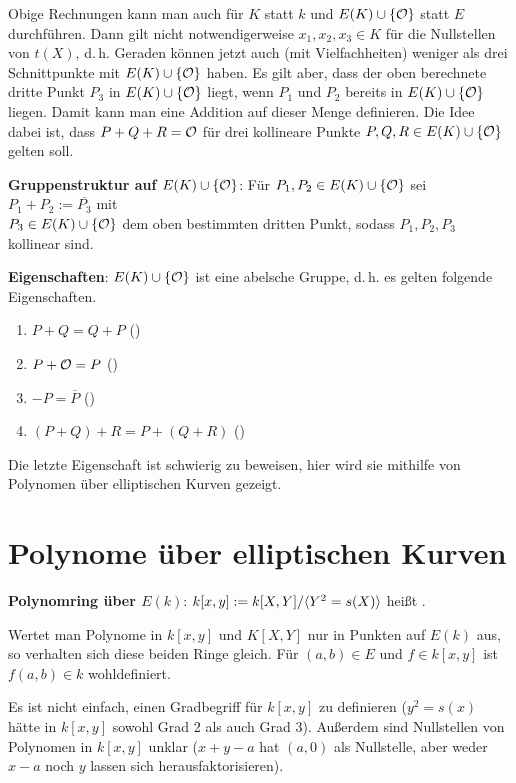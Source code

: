 Obige Rechnungen kann man auch für $K$ statt $k$ und $E(K) \cup \{\mathcal{O}\}$ statt $E$ durchführen.
Dann gilt nicht notwendigerweise $x_1, x_2, x_3 \in K$ für die Nullstellen von $t(X)$, d.\,h.
Geraden können jetzt auch (mit Vielfachheiten) weniger als drei Schnittpunkte mit
$E(K) \cup \{\mathcal{O}\}$ haben.
Es gilt aber, dass der oben berechnete dritte Punkt $P_3$ in $E(K) \cup \{\mathcal{O}\}$ liegt,
wenn $P_1$ und $P_2$ bereits in $E(K) \cup \{\mathcal{O}\}$ liegen.
Damit kann man eine Addition auf dieser Menge definieren.
Die Idee dabei ist, dass $P + Q + R = \mathcal{O}$ für drei kollineare Punkte $P, Q, R \in E(K) \cup \{\mathcal{O}\}$
gelten soll.

\textbf{Gruppenstruktur auf $E(K) \cup \{\mathcal{O}\}$}:
Für $P_1, P_2 \in E(K) \cup \{\mathcal{O}\}$ sei $P_1 + P_2 := \overline{P_3}$ mit\\
$P_3 \in E(K) \cup \{\mathcal{O}\}$ dem oben bestimmten dritten Punkt, sodass $P_1, P_2, P_3$ kollinear
sind.

\textbf{Eigenschaften}:
$E(K) \cup \{\mathcal{O}\}$ ist eine abelsche Gruppe, d.\,h. es gelten folgende Eigenschaften.
\begin{enumerate}
    \item
    $P + Q = Q + P$
    ()

    \item
    $P + \mathcal{O} = P$
    ()

    \item
    $-P = \overline{P}$
    ()

    \item
    $(P + Q) + R = P + (Q + R)$
    ()
\end{enumerate}
Die letzte Eigenschaft ist schwierig zu beweisen,
hier wird sie mithilfe von Polynomen über elliptischen Kurven gezeigt.

\pagebreak

\section{%
    Polynome über elliptischen Kurven%
}

\textbf{Polynomring über $E(k)$}:
$k[x, y] := k[X, Y]/\langle Y^2 = s(X)\rangle$ heißt .

Wertet man Polynome in $k[x, y]$ und $K[X, Y]$ nur in Punkten auf $E(k)$ aus, so verhalten
sich diese beiden Ringe gleich.
Für $(a, b) \in E$ und $f \in k[x, y]$ ist $f(a, b) \in k$ wohldefiniert.

Es ist nicht einfach, einen Gradbegriff für $k[x, y]$ zu definieren
($y^2 = s(x)$ hätte in $k[x, y]$ sowohl Grad 2 als auch Grad 3).
Außerdem sind Nullstellen von Polynomen in $k[x, y]$ unklar
($x + y - a$ hat $(a, 0)$ als Nullstelle,
aber weder $x - a$ noch $y$ lassen sich herausfaktorisieren).

